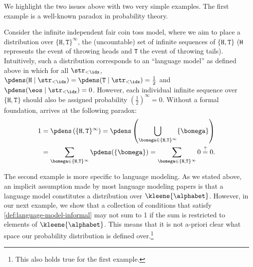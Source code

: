We highlight the two issues above with two very simple examples.
The first example is a well-known paradox in probability theory.
\begin{example}\label{ex:inf-coin-toss}
Consider the infinite independent fair coin toss model, where we aim to place a distribution over $\{\texttt{H},\texttt{T}\}^\infty$, the (uncountable) set of infinite sequences of $\{\texttt{H},\texttt{T}\}$ (\texttt{H} represents the event of throwing heads and \texttt{T} the event of throwing tails). 
Intuitively, such a distribution corresponds to an ``language model'' as defined above in which for all $\str_{<\idx}$, $\pdens(\texttt{H} \mid \str_{<\idx}) = \pdens(\texttt{T} \mid \str_{<\idx}) = \frac{1}{2}$ and $\pdens(\eos \mid \str_{<\idx})=0$.
However, each individual infinite sequence over $\{\texttt{H},\texttt{T}\}$ should also be assigned probability $(\frac{1}{2})^\infty = 0$. 
Without a formal foundation, arrives at the following paradox:
\begin{align*}
    1&=\pdens\left(\{\texttt{H},\texttt{T}\}^\infty\right) 
    =\pdens\left(\bigcup_{\bomega\in\{\texttt{H},\texttt{T}\}^\infty} \{\bomega\}\right) \\
    &=\sum_{\bomega\in\{\texttt{H},\texttt{T}\}^\infty}\pdens(\{\bomega\}) = \sum_{\bomega\in\{\texttt{H},\texttt{T}\}^\infty} 0 \stackrel{?}{=} 0. \nonumber
\end{align*}
\end{example}
The second example is more specific to language modeling.
As we stated above, an implicit assumption made by most language modeling papers is that a language model constitutes a distribution over $\kleene{\alphabet}$. 
However, in our next example, we show that a collection of conditions that satisfy \cref{def:language-model-informal} may not sum to 1 if the sum is restricted to elements of $\kleene{\alphabet}$. 
This means that it is not a-priori clear what space our probability distribution is defined over.\footnote{This also holds true for the first example.}
